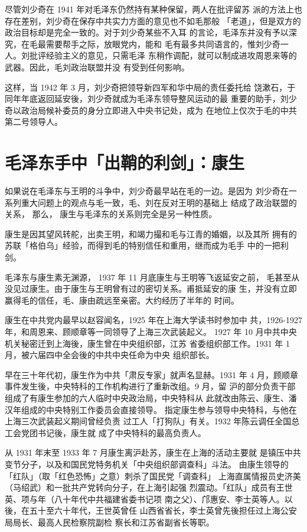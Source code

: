 尽管刘少奇在 1941 年对毛泽东仍然持有某种保留，两人在批评留苏
派的方法上也存在差别，刘少奇在保存中共实力方面的意见也不如毛那般
「老道」，但是双方的政治目标却是完全一致的。对于刘少奇某些不入耳
的言论，毛泽东并没有予以深究，在毛最需要帮手之际，放眼党内，能和
毛有最多共同语言的，惟刘少奇一人。刘批评经验主义的意见，只需毛泽
东稍作调配，就可以制成进攻周恩来等的武器。因此，毛刘政治联盟并没
有受到任何影响。

这样，当 1942 年 3 月，刘少奇把领导新四军和华中局的责任委托给
饶漱石，于同年年底返回延安後，刘少奇就成为毛泽东领导整风运动的最
重要的助手，刘少奇以政治局候补委员的身分立即进入中央书记处，成为
在地位上仅次于毛的中共第二号领导人。

\section{毛泽东手中「出鞘的利剑」：康生
}
如果说在毛泽东与王明的斗争中，刘少奇最早站在毛的一边。是因为
刘少奇在一系列重大问题上的观点与毛一致，毛、刘在反对王明的基础上
结成了政治联盟的关系，
那么，
康生与毛泽东的关系则完全是另一种性质。

康生是因其望风转舵，出卖王明，和竭力撮和毛与江青的婚姻，以及其所
拥有的苏联「格伯乌」经验，而得到毛的特别信任和重用，继而成为毛手
中的一把利剑。

毛泽东与康生素无渊源，
1937 年 11 月底康生与王明等飞返延安之前，
毛甚至从没见过康生。由于康生与王明曾有过的密切关系。甫抵延安的康
生，并没有立即赢得毛的信任，毛、康由疏远至亲密。大约经历了半年的
时间。

康生在中共党内最早以赵容闻名，1925 年在上海大学读书时参加中
共，1926-1927 年，和周恩来、顾顺章等一同领导了上海三次武装起义。
1927 年 10 月中共中央机关秘密迁到上海後，康生曾在中央组织部，江苏
省委组织部工作。1931 年 1 月，被六届四中全会後的中共中央任命为中央
组织部长。

早在三十年代初，康生作为中共「肃反专家」就声名显赫。1931 年 4
月，顾顺章事件发生後，中央特科的工作机构进行了重新改组。9 月，留
沪的部分负责干部组成了有康生参加的六人临时中央政治局，中央特科从
此就改由陈云、康生、潘汉年组成的中央特别工作委员会直接领导。
指定康生参与领导中央特科，与他在上海三次武装起义期间曾经负责
过工人「打狗队」有关。1932 年陈云调任全国总工会党团书记後，康生就
成了中央特科的最高负责人。

从 1931 年末至 1933 年 7 月康生离沪赴苏，康生在上海的活动主要就
是镇压中共变节分子，以及和国民党特务机关「中央组织部调查科」斗法。
由康生领导的「红队」（取「红色恐怖」之意）刺杀了国民党「调查科」
上海直属情报员史济美（马绍武）和一批共产党转向分子，在上海引起强
烈震动。「红队」成员有王世英、项与年（八十年代中共福建省委书记项
南之父）、邝惠安、李士英等人。以後，在五十至六十年代，王世英曾任
山西省省长，李士英曾先後担任过上海公安局局长、最高人民检察院副检
察长和江苏省副省长等职。

